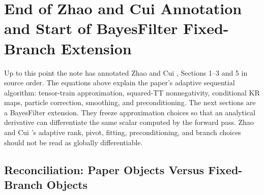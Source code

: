 \documentclass[11pt]{article}
\numberwithin{equation}{section}
\begin{document}
\begin{center}
\end{center}

\section{End of Zhao and Cui Annotation and Start of BayesFilter Fixed-Branch Extension}

Up to this point the note has annotated Zhao and Cui \cite{zhao2024ttsequential}, Sections 1--3 and 5 in
source order.  The equations above explain the paper's adaptive sequential
algorithm: tensor-train approximation, squared-TT nonnegativity, conditional KR
maps, particle correction, smoothing, and preconditioning.  The next sections
are a BayesFilter extension.  They freeze approximation choices so that an
analytical derivative can differentiate the same scalar computed by the forward
pass.  Zhao and Cui \cite{zhao2024ttsequential}'s adaptive rank, pivot, fitting, preconditioning, and branch
choices should not be read as globally differentiable.

\subsection*{Reconciliation: Paper Objects Versus Fixed-Branch Objects}
\end{document}

